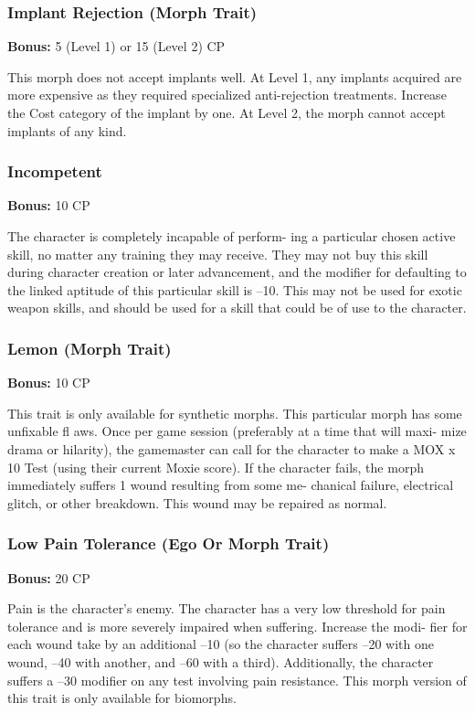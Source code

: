 \subsubsection{Implant Rejection (Morph Trait)}

\textbf{Bonus:} 5 (Level 1) or 15 (Level 2) CP

This morph does not accept implants well. At Level 
1, any implants acquired are more expensive as they 
required specialized anti-rejection treatments. Increase 
the Cost category of the implant by one. At Level 2, 
the morph cannot accept implants of any kind.

\subsubsection{Incompetent}

\textbf{Bonus:} 10 CP

The character is completely incapable of perform-
ing a particular chosen active skill, no matter any 
training they may receive. They may not buy this skill 
during character creation or later advancement, and 
the modifier for defaulting to the linked aptitude of 
this particular skill is –10. This may not be used for 
exotic weapon skills, and should be used for a skill 
that could be of use to the character.

\subsubsection{Lemon (Morph Trait)}

\textbf{Bonus:} 10 CP

This trait is only available for synthetic morphs. 
This particular morph has some unfixable fl aws. Once 
per game session (preferably at a time that will maxi-
mize drama or hilarity), the gamemaster can call for 
the character to make a MOX x 10 Test (using their 
current Moxie score). If the character fails, the morph 
immediately suffers 1 wound resulting from some me-
chanical failure, electrical glitch, or other breakdown. 
This wound may be repaired as normal.

\subsubsection{Low Pain Tolerance (Ego Or Morph Trait)}

\textbf{Bonus:} 20 CP

Pain is the character's enemy. The character has 
a very low threshold for pain tolerance and is more 
severely impaired when suffering. Increase the modi-
fier for each wound take by an additional –10 (so 
the character suffers –20 with one wound, –40 with 
another, and –60 with a third). Additionally, the 
character suffers a –30 modifier on any test involving 
pain resistance. This morph version of this trait is only 
available for biomorphs.

